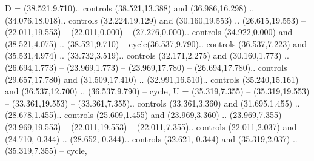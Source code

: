 {D} = {(38.521,9.710).. controls (38.521,13.388) and (36.986,16.298) .. (34.076,18.018).. controls (32.224,19.129) and (30.160,19.553) .. (26.615,19.553) -- (22.011,19.553) -- (22.011,0.000) -- (27.276,0.000).. controls (34.922,0.000) and (38.521,4.075) .. (38.521,9.710) -- cycle(36.537,9.790).. controls (36.537,7.223) and (35.531,4.974) .. (33.732,3.519).. controls (32.171,2.275) and (30.160,1.773) .. (26.694,1.773) -- (23.969,1.773) -- (23.969,17.780) -- (26.694,17.780).. controls (29.657,17.780) and (31.509,17.410) .. (32.991,16.510).. controls (35.240,15.161) and (36.537,12.700) .. (36.537,9.790) -- cycle},
{U} = {(35.319,7.355) -- (35.319,19.553) -- (33.361,19.553) -- (33.361,7.355).. controls (33.361,3.360) and (31.695,1.455) .. (28.678,1.455).. controls (25.609,1.455) and (23.969,3.360) .. (23.969,7.355) -- (23.969,19.553) -- (22.011,19.553) -- (22.011,7.355).. controls (22.011,2.037) and (24.710,-0.344) .. (28.652,-0.344).. controls (32.621,-0.344) and (35.319,2.037) .. (35.319,7.355) -- cycle},
